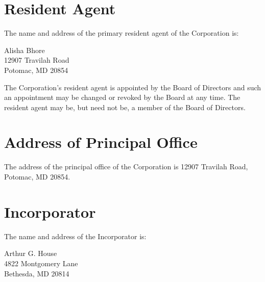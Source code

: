 \documentclass{wst}
\begin{document}
\section{Resident Agent}
The name and address of the primary resident agent of the Corporation is:
\newline\newline
\parbox{\textwidth}{\centering Alisha Bhore\\ 12907 Travilah Road\\ Potomac, MD 20854}
\newline\newline
The Corporation’s resident agent is appointed by the Board of Directors and such an appointment may be changed or revoked by the Board at any time.  The resident agent may be, but need not be, a member of the Board of Directors.

\section{Address of Principal Office}
The address of the principal office of the Corporation is 12907 Travilah Road, Potomac, MD 20854.

\section{Incorporator}
The name and address of the Incorporator is:
\newline\newline
\parbox{\textwidth}{\centering Arthur G. House\\ 4822 Montgomery Lane\\ Bethesda, MD 20814}
\vfill
\end{document}

